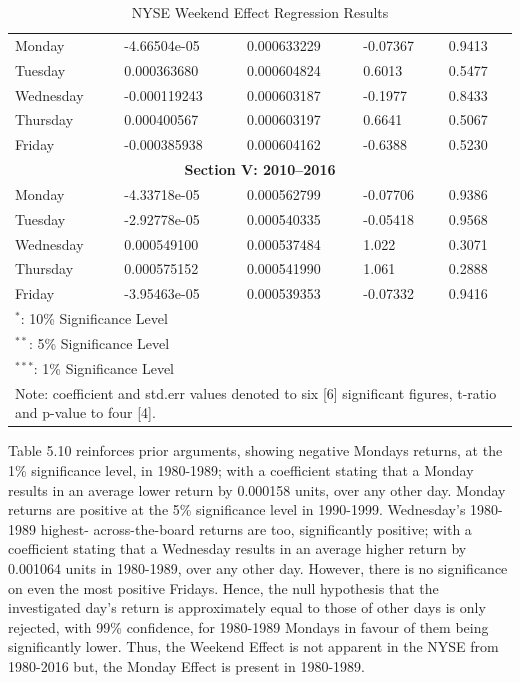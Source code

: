 \documentclass[11pt, english]{article}
\begin{document}
\begin{table}[h]
\begin{center}
\begin{tabular}{p{2cm}p{2cm}p{2cm}p{2cm}p{2cm}}
		\hline            
                Monday & -4.66504e-05 & 0.000633229 & -0.07367 & 0.9413\\   
                Tuesday & 0.000363680 & 0.000604824 & 0.6013 & 0.5477\\  
                Wednesday & -0.000119243 & 0.000603187 & -0.1977 & 0.8433\\
                Thursday & 0.000400567 & 0.000603197 & 0.6641 & 0.5067\\
                Friday & -0.000385938 & 0.000604162 & -0.6388 & 0.5230\\     
                \hline                                             
                \multicolumn{5}{c}{\textbf{Section V: 2010--2016}}\\
		\hline
		Monday & -4.33718e-05 & 0.000562799 & -0.07706 & 0.9386\\ 
                Tuesday & -2.92778e-05 & 0.000540335 & -0.05418 & 0.9568\\
                Wednesday & 0.000549100 & 0.000537484 & 1.022 & 0.3071\\
                Thursday & 0.000575152 & 0.000541990 & 1.061 & 0.2888\\
                Friday & -3.95463e-05 & 0.000539353 & -0.07332 & 0.9416\\ 
                \hline
		\multicolumn{5}{l}{$^*$: 10\% Significance Level}\\
		\multicolumn{5}{l}{$^{**}$: 5\% Significance Level}\\
		\multicolumn{5}{l}{$^{***}$: 1\% Significance Level}\\
		\hline
		\multicolumn{5}{p{11.5cm}}{Note: coefficient and std.err values denoted to six [6] significant figures, t-ratio and p-value to four [4].}\\
		\hline
	\end{tabular}
		\caption{NYSE Weekend Effect Regression Results}
	\end{center}
	\end{table}

	Table 5.10 reinforces prior arguments, showing negative Mondays returns, at the 1\% significance level, in 1980-1989; with a coefficient stating that a Monday results in an average lower return by 0.000158 units, over any other day. Monday returns are positive at the 5\% significance level in 1990-1999. Wednesday’s 1980-1989 highest- across-the-board returns are too, significantly positive; with a coefficient stating that a Wednesday results in an average higher return by 0.001064 units in 1980-1989, over any other day. However, there is no significance on even the most positive Fridays. Hence, the null hypothesis that the investigated day’s return is approximately equal to those of other days is only rejected, with 99\% confidence, for 1980-1989 Mondays in favour of them being significantly lower. Thus, the Weekend Effect is not apparent in the NYSE from 1980-2016 but, the Monday Effect is present in 1980-1989.
\end{document}
